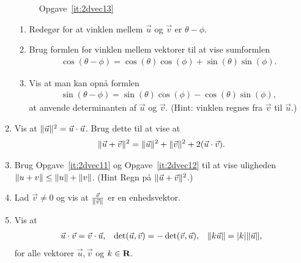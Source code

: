 \begin{enumerate}
\begin{figure}
		\caption{Opgave~\ref{it:2dvec13}}
		\label{fig:2dvec13}
	\end{figure}
		\begin{enumerate}
			\item Redegør for at vinklen mellem $\vec{u}$ og $\vec{v}$ er $\theta-\phi$.
			\item Brug formlen for vinklen mellem vektorer til at vise sumformlen
			\begin{align*}
			\cos(\theta-\phi)=\cos(\theta)\cos(\phi)+\sin(\theta)\sin(\phi).
			\end{align*}
			\item Vis at man kan opnå formlen 
			\begin{align*}
			\sin(\theta-\phi)=\sin(\theta)\cos(\phi)-\cos(\theta)\sin(\phi),
			\end{align*}
			 at anvende determinanten af $\vec{u}$ og $\vec{v}$. (Hint: vinklen regnes fra $\vec{v}$ til $\vec{u}$.)
			
		\end{enumerate}
	
	
	\item\label{it:2dvec12} Vis at $\Vert \vec{u}\Vert^2=\vec{u}\cdot \vec{u}$. Brug dette til at vise at 
	\begin{align*}
	\Vert \vec{u}+\vec{v}\Vert^2=\Vert \vec{u}\Vert^2+\Vert \vec{v}\Vert^2+2(\vec{u}\cdot \vec{v}).
	\end{align*}
	
	\item Brug Opgave~\ref{it:2dvec11} og Opgave~\ref{it:2dvec12} til at vise uligheden $\Vert u+v\Vert\leq \Vert u\Vert+\Vert v\Vert$. (Hint Regn på $\Vert \vec{u}+\vec{v}\Vert^2$.)
	
	\item Lad $\vec{v}\neq 0$ og vis at $\frac{\vec{v}}{\Vert \vec{v}\Vert}$ er en enhedsvektor.
	
	
	
	
	\item Vis at 
	\begin{align*}
	\vec{u}\cdot \vec{v}=\vec{v}\cdot \vec{u},&& \det(\vec{u},\vec{v})=-\det(\vec{v},\vec{u}),&& \Vert k\vec{u}\Vert=\vert k\vert\Vert \vec{u}\Vert,
	\end{align*}
	for alle vektorer $\vec{u},\vec{v}$ og $k\in \mathbf{R}$.
	

\end{enumerate}